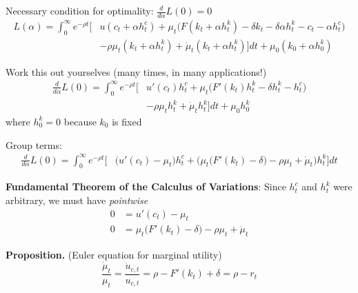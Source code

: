 \documentclass[10pt]{beamer}
\begin{document}
\begin{frame}{}

Necessary condition for optimality: $\frac{d}{d \alpha} L(0) = 0$
\begin{align*}
	L(\alpha) = \int_0^\infty e^{-\rho t} \bigg[ &u(c_t + \alpha h_t^c) + \mu_t \bigg( F(k_t + \alpha h_t^k) - \delta k_t - \delta \alpha h_t^k - c_t - \alpha h_t^c \bigg) \\
	&- \rho \mu_t (k_t + \alpha h_t^k) + \dot \mu_t (k_t + \alpha h_t^k) \bigg] dt + \mu_0 (k_0 + \alpha h_0^k)
\end{align*}

Work this out yourselves (many times, in many applications!)
\begin{align*}
	\frac{d}{d \alpha}L(0) = \int_0^\infty e^{-\rho t} \bigg[ &u'(c_t) h_t^c + \mu_t \bigg( F'(k_t) h_t^k  - \delta h_t^k - h_t^c \bigg) \\
	&- \rho \mu_t h_t^k + \dot \mu_t h_t^k \bigg] dt + \mu_0 h_0^k
\end{align*}
where $h_0^k = 0$ because $k_0$ is fixed


\end{frame}



\begin{frame}{}
	
Group terms: 
\begin{align*}
	\frac{d}{d \alpha}L(0) = \int_0^\infty e^{-\rho t} \bigg[ &\bigg( u'(c_t) - \mu_t \bigg) h_t^c + \bigg( \mu_t \Big( F'(k_t) - \delta \Big) - \rho \mu_t + \dot \mu_t \bigg) h_t^k \bigg] dt 
\end{align*}

\vspace{5mm}
\textbf{Fundamental Theorem of the Calculus of Variations}: Since $h_t^c$ and $h_t^k$ were arbitrary, we must have \textit{pointwise}
\begin{align*}
	0 &= u'(c_t) - \mu_t \\
	0 &= \mu_t \Big( F'(k_t) - \delta \Big) - \rho \mu_t + \dot \mu_t
\end{align*}

\vspace{5mm}
\textbf{Proposition.} (Euler equation for marginal utility) 
\begin{equation*}
	\frac{\dot \mu_t}{\mu_t} = \frac{\dot u_{c, t}}{u_{c, t}} = \rho -  F'(k_t) + \delta = \rho - r_t 
\end{equation*}
	
\end{frame}
\end{document}
